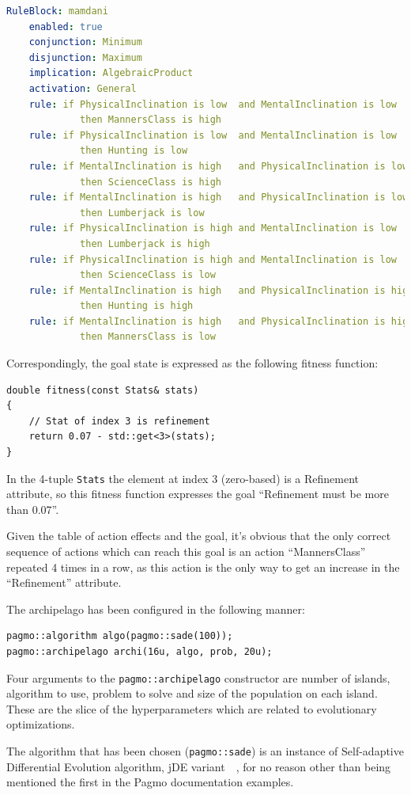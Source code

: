 \documentclass[12pt, a4paper]{report}
\begin{document}
\begin{lstlisting}[language=yaml]
RuleBlock: mamdani
	enabled: true
	conjunction: Minimum
	disjunction: Maximum
	implication: AlgebraicProduct
	activation: General
	rule: if PhysicalInclination is low  and MentalInclination is low
		     then MannersClass is high
	rule: if PhysicalInclination is low  and MentalInclination is low    
			 then Hunting is low
	rule: if MentalInclination is high   and PhysicalInclination is low  
			 then ScienceClass is high
	rule: if MentalInclination is high   and PhysicalInclination is low  
			 then Lumberjack is low
	rule: if PhysicalInclination is high and MentalInclination is low    
			 then Lumberjack is high
	rule: if PhysicalInclination is high and MentalInclination is low    
			 then ScienceClass is low
	rule: if MentalInclination is high   and PhysicalInclination is high 
			 then Hunting is high
	rule: if MentalInclination is high   and PhysicalInclination is high 
		     then MannersClass is low
	\end{lstlisting}
	
	Correspondingly, the goal state is expressed as the following fitness function:
	
	\begin{lstlisting}
double fitness(const Stats& stats)
{
	// Stat of index 3 is refinement
	return 0.07 - std::get<3>(stats);
}
	\end{lstlisting}
	
	In the 4-tuple \texttt{Stats} the element at index 3 (zero-based) is a Refinement attribute, so this fitness function expresses the goal ``Refinement must be more than 0.07''.
	
	Given the table of action effects and the goal, it's obvious that the only correct sequence of actions which can reach this goal is an action ``MannersClass'' repeated 4 times in a row, as this action is the only way to get an increase in the ``Refinement'' attribute.
	
	The archipelago has been configured in the following manner:
	
	\begin{lstlisting}
pagmo::algorithm algo(pagmo::sade(100));
pagmo::archipelago archi(16u, algo, prob, 20u);
	\end{lstlisting}

	Four arguments to the \texttt{pagmo::archipelago} constructor are number of islands, algorithm to use, problem to solve and size of the population on each island.
	These are the slice of the hyperparameters which are related to evolutionary optimizations.
	
	The algorithm that has been chosen (\texttt{pagmo::sade}) is an instance of Self-adaptive Differential Evolution algorithm, jDE variant~\cite{sade_jDE}~\cite{sade_iDE}, for no reason other than being mentioned the first in the Pagmo documentation examples.
\end{document}
